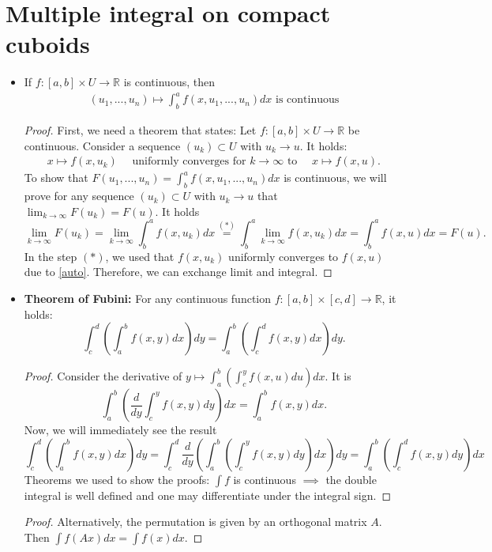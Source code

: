 \documentclass[a4paper, 11pt]{article}
\theoremstyle{plain}
\theoremstyle{definition}
\begin{document}
\section{Multiple integral on compact cuboids}
\begin{itemize}
	\item If $f: [a,b] \times U \to \mathbb R$ is continuous, then
	 \begin{align}\label{lena}
		(u_1,...,u_n) \mapsto \int_b^{a}f(x,u_1,...,u_n) dx \text{ is continuous}
	\end{align}
	\begin{proof}
		First, we need a theorem that states: Let $f: [a,b] \times U \to \mathbb R$ be continuous. Consider a sequence $(u_k) \subset U$ with $u_k \to u$. It holds:
		\begin{align}\label{auto}
			x \mapsto f(x,u_k) \quad \text{ uniformly converges for $k \to \infty$ to } \quad  x \mapsto f(x,u).
		\end{align}
		To show that $F(u_1,...,u_n) =  \int_b^{a}f(x,u_1,...,u_n) dx$ is continuous, we will prove for any sequence $(u_k) \subset U$ with $u_k \to u$ that $\lim_{k\to \infty}F(u_k) = F(u)$. It holds
		\[
			\lim_{k \to \infty} F(u_k) = \lim_{k \to \infty} \int^{a}_b f(x,u_k)dx \overset{(*)}{=} \int^{a}_b \lim_{k \to \infty} f(x,u_k)dx = \int^{a}_b f(x,u)dx = F(u).
		\]
		In the step $(*)$, we used that $f(x,u_k)$ uniformly converges to $f(x,u)$ due to \eqref{auto}. Therefore, we can exchange limit and integral.
	\end{proof}

	\item \textbf{Theorem of Fubini:} For any continuous function $f: [a,b] \times [c,d] \to \mathbb R$, it holds:
	\[
		\int^d_c\left(\int^b_a f(x,y) dx\right) dy = \int^b_a\left(\int^d_c f(x,y) dx\right) dy.
	\]
	\begin{proof}
		Consider the derivative of $y \mapsto  \int^b_a\left(\int^y_c f(x,u) du\right) dx$. It is
		\[
			\int^b_a \left(\frac{d}{dy} \int^y_c f(x,y)dy\right)dx = \int^b_a f(x,y) dx.
		\]
		Now, we will immediately see the result
		\[
				\int^d_c\left(\int^b_a f(x,y) dx\right) dy = \int^d_c  \frac{d}{dy} \left( \int^b_a \left( \int^y_c f(x,y)dy\right)dx \right) dy = \int^b_a \left( \int^d_c f(x,y)dy\right)dx
		\]
		Theorems we used to show the proofs: $\int f$ is continuous $\implies$ the double integral is well defined and one may differentiate under the integral sign.
	\end{proof}

	\begin{proof}
		Alternatively, the permutation is given by an orthogonal matrix $A$. Then $\int f(Ax) dx = \int f(x)dx$.
	\end{proof}
\end{itemize}
\end{document}
